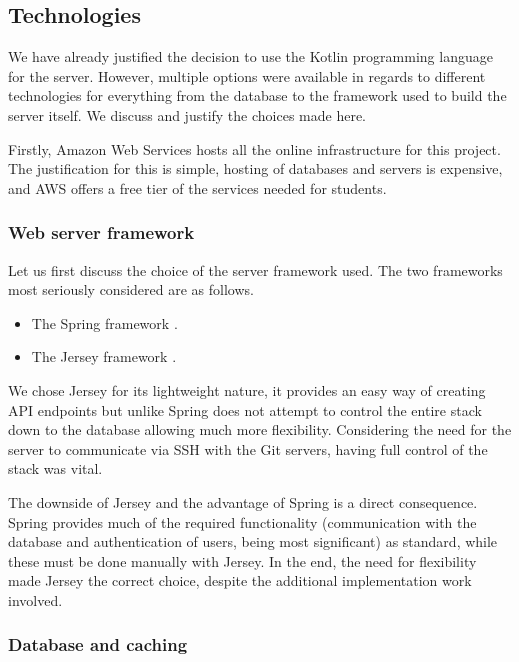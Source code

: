 \subsection{Technologies}\label{sec:technologies}

We have already justified the decision to use the Kotlin programming language for the server. However, multiple options were available in regards to different technologies for everything from the database to the framework used to build the server itself. We discuss and justify the choices made here.

Firstly, Amazon Web Services hosts all the online infrastructure for this project. The justification for this is simple, hosting of databases and servers is expensive, and AWS offers a free tier of the services needed for students.

\subsubsection{Web server framework}

Let us first discuss the choice of the server framework used. The two frameworks most seriously considered are as follows.

\begin{itemize}
\item The Spring framework \cite{spring}.
\item The Jersey framework \cite{jersey}.
\end{itemize}

We chose Jersey for its lightweight nature, it provides an easy way of creating API endpoints but unlike Spring does not attempt to control the entire stack down to the database allowing much more flexibility. Considering the need for the server to communicate via SSH with the Git servers, having full control of the stack was vital.

The downside of Jersey and the advantage of Spring is a direct consequence. Spring provides much of the required functionality (communication with the database and authentication of users, being most significant) as standard, while these must be done manually with Jersey. In the end, the need for flexibility made Jersey the correct choice, despite the additional implementation work involved.

\subsubsection{Database and caching}

